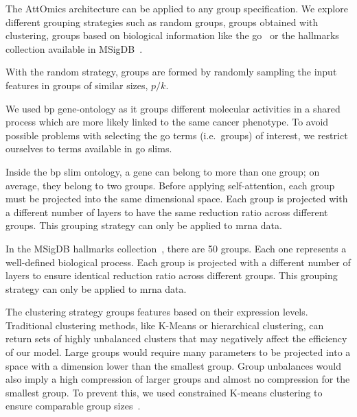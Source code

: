 \documentclass[../main.tex]{subfiles}
\begin{document}
	    The AttOmics architecture can be applied to any group specification.
	    We explore different grouping strategies such as random groups, groups obtained with clustering, groups based on biological information like the \gls{go}~\cite{geneontologyconsortiumGeneOntologyResource2021} or the hallmarks collection available in MSigDB~\cite{Liberzon2015}.

	    \begin{description}[
	            style=multiline,
	            leftmargin=!,
	            labelwidth=2.2cm
	        ]
	        \item[Random]
		        With the random strategy, groups are formed by randomly sampling the input features in groups of similar sizes, \(p/k\).
	        \item[Gene Ontology]
		        We used \gls{bp} gene-ontology as it groups different molecular activities in a shared process which are more likely linked to the same cancer phenotype.
		        To avoid possible problems with selecting the \gls{go} terms (i.e.\ groups) of interest, we restrict ourselves to terms available in \gls{go} slims.

		        Inside the \gls{bp} slim ontology, a gene can belong to more than one group; on average, they belong to two groups.
		        Before applying self-attention, each group must be projected into the same dimensional space.
		        Each group is projected with a different number of layers to have the same reduction ratio across different groups. This grouping strategy can only be applied to \gls{mrna} data.
	        \item[Hallmarks]
		        In the MSigDB hallmarks collection~\cite{Liberzon2015}, there are 50 groups.
		        Each one represents a well-defined biological process.
		        Each group is projected with a different number of layers to ensure identical reduction ratio across different groups. This grouping strategy can only be applied to \gls{mrna} data.
	        \item[Clustering]
		        The clustering strategy groups features based on their expression levels.
		        Traditional clustering methods, like K-Means or hierarchical clustering, can return sets of highly unbalanced clusters that may negatively affect the efficiency of our model.
		        Large groups would require many parameters to be projected into a space with a dimension lower than the smallest group.
		        Group unbalances would also imply a high compression of larger groups and almost no compression for the smallest group.
		        To prevent this, we used constrained K-means clustering to ensure comparable group sizes~\cite{bradleyConstrainedKMeansClustering}.
	    \end{description}
\end{document}
